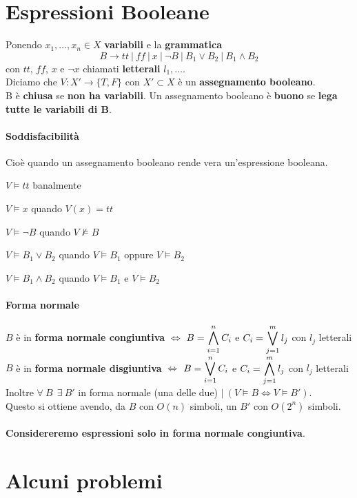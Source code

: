 \documentclass[10pt]{book}
\begin{document}
\section{Espressioni Booleane}
Ponendo $x_1,\ldots,x_n \in X$ \textbf{variabili} e la \textbf{grammatica} $$B\longrightarrow tt\:|\:ff\:|\:x\:|\:\neg B\:|\:B_1 \vee B_2\:|\:B_1 \wedge B_2$$ con $tt$, $ff$, $x$ e $\neg x$ chiamati \textbf{letterali} $l_1,\ldots$.\\
Diciamo che $V : X' \longrightarrow \{T, F\}$ con $X' \subset X$ è un \textbf{assegnamento booleano}.\\
B è \textbf{chiusa} se \textbf{non ha variabili}. Un assegnamento booleano è \textbf{buono} se \textbf{lega tutte le variabili di B}.
\paragraph{Soddisfacibilità} Cioè quando un assegnamento booleano rende vera un'espressione booleana.\begin{list}{}{}
	\item $V \vDash tt$ banalmente
	\item $V \vDash x$ quando $V(x) = tt$
	\item $V \vDash \neg B$ quando $V \not\vDash B$
	\item $V \vDash B_1 \vee B_2$ quando $V \vDash B_1$ oppure $V \vDash B_2$
	\item $V \vDash B_1 \wedge B_2$ quando $V \vDash B_1$ e $V \vDash B_2$
\end{list}
\paragraph{Forma normale} $B$ è in \textbf{forma normale congiuntiva} $\Leftrightarrow$ $B = \mathlarger{\bigwedge_{i=1}^n C_i}$ e $C_i = \mathlarger{\bigvee_{j=1}^m l_j}$ con $l_j$ letterali\\
$B$ è in \textbf{forma normale disgiuntiva} $\Leftrightarrow$ $B = \mathlarger{\bigvee_{i=1}^n C_i}$ e $C_i = \mathlarger{\bigwedge_{j=1}^m l_j}$ con $l_j$ letterali\\
Inoltre $\forall\:B\:\:\exists\:B'$ in forma normale (una delle due) $|\:(V\vDash B \Leftrightarrow V\vDash B')$.\\
Questo si ottiene avendo, da $B$ con $O(n)$ simboli, un $B'$ con $O(2^n)$ simboli.\\\\
\textbf{Considereremo espressioni solo in forma normale congiuntiva}.
\pagebreak
\section{Alcuni problemi}
\end{document}
